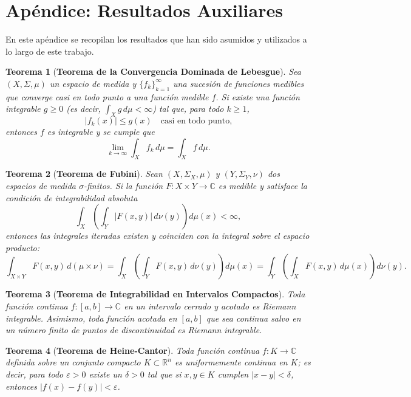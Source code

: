 \documentclass[12pt]{article}
\theoremstyle{plain}
\newtheorem{teorema}{Teorema}[section] %
\theoremstyle{definition}
\numberwithin{equation}{section}
\begin{document}
\section{Apéndice: Resultados Auxiliares}
En este apéndice se recopilan los resultados que han sido asumidos y utilizados a lo largo de este trabajo.
\begin{teorema}[\textbf{Teorema de la Convergencia Dominada de Lebesgue}]
    \label{TCD}
    Sea $(X, \Sigma, \mu)$ un espacio de medida y $\{f_k\}_{k=1}^{\infty}$ una sucesión de funciones medibles que converge casi en todo punto a una función medible $f$. Si existe una función integrable $g \ge 0$ (es decir, $\int_X g \,d\mu < \infty$) tal que, para todo $k \ge 1$,
    \begin{equation*}
        |f_k(x)| \le g(x) \quad \text{casi en todo punto,}
    \end{equation*}
    entonces $f$ es integrable y se cumple que
    \begin{equation*}
        \lim_{k \to \infty} \int_X f_k \,d\mu = \int_X f \,d\mu.
    \end{equation*}
\end{teorema}
\begin{teorema}[\textbf{Teorema de Fubini}]
    \label{fubini}
    Sean $(X, \Sigma_X, \mu)$ y $(Y, \Sigma_Y, \nu)$ dos espacios de medida $\sigma$-finitos. Si la función $F \colon X \times Y \to \mathbb{C}$ es medible y satisface la condición de integrabilidad absoluta
    \begin{equation*}
        \int_X \left( \int_Y |F(x,y)| \,d\nu(y) \right) d\mu(x) < \infty,
    \end{equation*}
    entonces las integrales iteradas existen y coinciden con la integral sobre el espacio producto:
    \begin{equation*}
        \int_{X \times Y} F(x,y) \,d(\mu \times \nu) = \int_X \left( \int_Y F(x,y) \,d\nu(y) \right) d\mu(x) = \int_Y \left( \int_X F(x,y) \,d\mu(x) \right) d\nu(y).
    \end{equation*}
\end{teorema}
\begin{teorema}[\textbf{Teorema de Integrabilidad en Intervalos Compactos}]
    Toda función continua $f \colon [a,b] \to \mathbb{C}$ en un intervalo cerrado y acotado es Riemann integrable. Asimismo, toda función acotada en $[a,b]$ que sea continua salvo en un número finito de puntos de discontinuidad es Riemann integrable.
\end{teorema}
\begin{teorema}[\textbf{Teorema de Heine-Cantor}]
    \label{heinecantor}
    Toda función continua $f \colon K \to \mathbb{C}$ definida sobre un conjunto compacto $K \subset \mathbb{R}^n$ es uniformemente continua en $K$; es decir, para todo $\varepsilon > 0$ existe un $\delta > 0$ tal que si $x, y \in K$ cumplen $|x - y| < \delta$, entonces $|f(x) - f(y)| < \varepsilon$.
\end{teorema}
\end{document}
